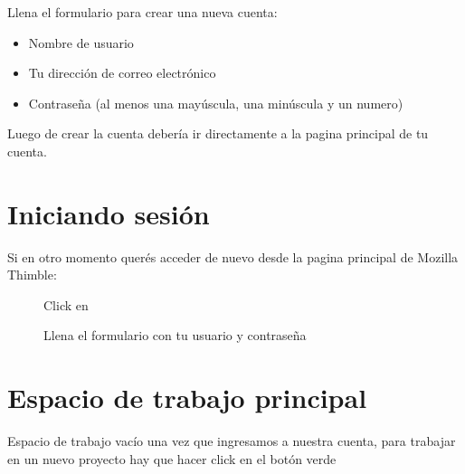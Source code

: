 \documentclass[letterpaper,10pt,spanish]{sphinxmanual}
\begin{document}
Llena el formulario para crear una nueva cuenta:
\begin{itemize}
\item {} 
Nombre de usuario

\item {} 
Tu dirección de correo electrónico

\item {} 
Contraseña (al menos una mayúscula, una minúscula y un numero)

\end{itemize}

\begin{figure}[htbp]
\centering

\noindent{}
\end{figure}

Luego de crear la cuenta debería ir directamente a la pagina principal de tu
cuenta.


\section{Iniciando sesión}
\label{\detokenize{introduccion:iniciando-sesion}}
Si en otro momento querés acceder de nuevo desde la pagina principal de Mozilla
Thimble:

\begin{figure}[htbp]
\centering
\capstart

\noindent{}
\caption{Click en }\label{\detokenize{introduccion:id2}}\end{figure}

\begin{figure}[htbp]
\centering
\capstart

\noindent{}
\caption{Llena el formulario con tu usuario y contraseña}\label{\detokenize{introduccion:id3}}\end{figure}


\section{Espacio de trabajo principal}
\label{\detokenize{introduccion:espacio-de-trabajo-principal}}
Espacio de trabajo vacío una vez que ingresamos a nuestra cuenta, para trabajar
en un nuevo proyecto hay que hacer click en el botón verde 

\begin{figure}[htbp]
\centering

\noindent{}
\end{figure}
\end{document}
